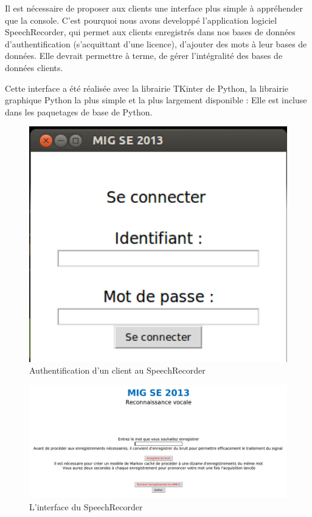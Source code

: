 \documentclass[a4paper,12pt]{report}
\begin{document}
Il est nécessaire de proposer aux clients une interface plus simple à appréhender que la console. C'est pourquoi nous avons developpé l'application logiciel SpeechRecorder, qui permet aux clients enregistrés dans nos bases de données d'authentification (s'acquittant d'une licence), d'ajouter des mots à leur bases de données. Elle devrait permettre à terme, de gérer l'intégralité des bases de données clients.

\medskip{}

Cette interface a été réalisée avec la librairie TKinter de Python, la librairie graphique Python la plus simple et la plus largement disponible : Elle est incluse dans les paquetages de base de Python.

\begin{figure}[H]
	\begin{center}
	\includegraphics[width=14cm]{pics/speechrecorder-log.png} 
	\end{center}
	\caption{Authentification d'un client au SpeechRecorder}
\end{figure}

\begin{figure}[H]
	\begin{center}
	\includegraphics[width=14cm]{pics/speechrecorder-record.png} 
	\end{center}
	\caption{L'interface du SpeechRecorder}
\end{figure}
\end{document}
